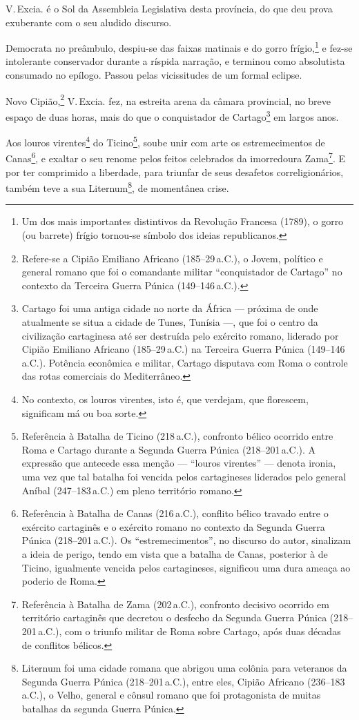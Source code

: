 V.\,Excia. é o Sol da Assembleia Legislativa desta província, do que deu
prova exuberante com o seu aludido discurso.

Democrata no preâmbulo, despiu-se das faixas matinais e do gorro
frígio,\footnote{Um dos mais importantes distintivos da Revolução
  Francesa (1789), o gorro (ou barrete) frígio tornou-se símbolo dos
  ideias republicanos.\label{gorro}} e fez-se intolerante conservador durante a
ríspida narração, e terminou como absolutista consumado no epílogo.
Passou pelas vicissitudes de um formal eclipse.

Novo Cipião,\footnote{Refere-se a Cipião Emiliano Africano (185--29\,a.C.), 
o Jovem, político e general romano que foi o comandante militar
  ``conquistador de Cartago'' no contexto da Terceira Guerra Púnica
  (149--146\,a.C.).} V.\,Excia. fez, na estreita arena da câmara
provincial, no breve espaço de duas horas, mais do que o conquistador de
Cartago\footnote{Cartago foi uma antiga cidade no norte da África ---
  próxima de onde atualmente se situa a cidade de Tunes, Tunísia ---, que
  foi o centro da civilização cartaginesa até ser destruída pelo
  exército romano, liderado por Cipião Emiliano Africano (185--29\,a.C.) na
  Terceira Guerra Púnica (149--146\,a.C.). Potência econômica e militar,
  Cartago disputava com Roma o controle das rotas comerciais do
  Mediterrâneo.} em largos anos.

Aos louros virentes\footnote{No contexto, os louros virentes, isto é,
  que verdejam, que florescem, significam má ou boa sorte.} do
Ticino\footnote{Referência à Batalha de Ticino (218\,a.C.), confronto
  bélico ocorrido entre Roma e Cartago durante a Segunda Guerra Púnica
  (218--201\,a.C.). A expressão que antecede essa menção --- ``louros
  virentes'' --- denota ironia, uma vez que tal batalha foi vencida pelos
  cartagineses liderados pelo general Aníbal (247--183\,a.C.) em
  pleno território romano.}, soube unir com arte os estremecimentos de
Canas\footnote{Referência à Batalha de Canas (216\,a.C.), conflito
  bélico travado entre o exército cartaginês e o exército romano no
  contexto da Segunda Guerra Púnica (218--201\,a.C.). Os ``estremecimentos'',
  no discurso do autor, sinalizam a ideia de perigo, tendo em vista que
  a batalha de Canas, posterior à de Ticino, igualmente vencida pelos
  cartagineses, significou uma dura ameaça ao poderio de Roma.}, e
exaltar o seu renome pelos feitos celebrados da imorredoura
Zama\footnote{Referência à Batalha de Zama (202\,a.C.), confronto
  decisivo ocorrido em território cartaginês que decretou o desfecho da
  Segunda Guerra Púnica (218--201\,a.C.), com o triunfo militar de Roma
  sobre Cartago, após duas décadas de conflitos bélicos.}. E por ter
comprimido a liberdade, para triunfar de seus desafetos
correligionários, também teve a sua Liternum\footnote{Liternum foi uma
  cidade romana que abrigou uma colônia para veteranos da Segunda Guerra
  Púnica (218--201\,a.C.), entre eles, Cipião Africano (236--183\,a.C.), o
  Velho, general e cônsul romano que foi protagonista de muitas batalhas
  da segunda Guerra Púnica.}, de momentânea crise.

